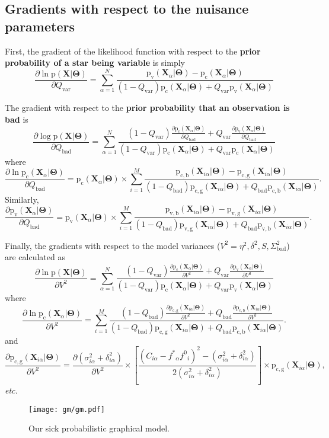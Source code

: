 \documentclass[12pt,preprint]{aastex}
\newcommand{\foreign}[1]{\emph{#1}}
\newcommand{\figlabel}[1]{\label{fig:#1}}
\newcommand{\paramvector}[1]{\boldsymbol{#1}}
\newcommand{\grad}[2]{\frac{\partial #1}{\partial #2}}
\renewcommand{\Pr}{\mathrm{p}}
\newcommand{\model}     {\ensuremath{\paramvector{\Theta}} }
\newcommand{\data}      {\ensuremath{\mathbf{X}} }
\newcommand{\X}         {\ensuremath{\mathbf{X}} }
\newcommand{\fstar}     {\ensuremath{f^*} }
\newcommand{\fzero}     {\ensuremath{f^0}}
\newcommand{\jabs}      {\ensuremath{\delta} }
\newcommand{\jrel}      {\ensuremath{\eta} }
\newcommand{\jitter}[1] {\ensuremath{\delta_{#1}^2} }
\newcommand{\Stot}      {\ensuremath{\sigma_{i\alpha}^2 + \jitter{i\alpha}} }
\newcommand{\Sbad}      {\ensuremath{\Sigma_\mathrm{bad}^2} }
\newcommand{\Qbad}      {\ensuremath{Q_\mathrm{bad}} }
\newcommand{\Qvar}      {\ensuremath{Q_\mathrm{var}} }
\newcommand{\Svar}      {\ensuremath{S} }
\newcommand{\pconst}    {\ensuremath{\Pr_\mathrm{c} (\X_\alpha | \model) }}
\newcommand{\pvar}      {\ensuremath{\Pr_\mathrm{v} (\X_\alpha | \model) }}
\newcommand{\pvarbad}   {\ensuremath{\Pr_\mathrm{v,b} (\X_{i\alpha} | \model)} }
\newcommand{\pvargood}  {\ensuremath{\Pr_\mathrm{v,g} (\X_{i\alpha} | \model)} }
\newcommand{\pconstbad} {\ensuremath{\Pr_\mathrm{c,b} (\X_{i\alpha} | \model)} }
\newcommand{\pconstgood}{\ensuremath{\Pr_\mathrm{c,g} (\X_{i\alpha} | \model)} }
\begin{document}
\subsection{Gradients with respect to the nuisance parameters}

First, the gradient of the likelihood function with respect to the {\bf prior
probability of a star being variable} is simply
\begin{equation}
    \grad{\ln \Pr (\data | \model)}{\Qvar} =
        \sum_{\alpha = 1}^{N} \frac{\pvar - \pconst}{ (1-\Qvar)
            \pconst  + \Qvar
            \pvar}
\end{equation}

The gradient with respect to the {\bf prior probability that an observation is
bad} is
\begin{equation}
    \grad{\log \Pr (\data | \model)}{\Qbad} =
        \sum_{\alpha = 1}^{N} \frac{(1-\Qvar)
            \grad{\pconst}{\Qbad}  + \Qvar
            \grad{\pvar}{\Qbad}}{ (1-\Qvar) \pconst  + \Qvar \pconst}
\end{equation}
where
\begin{equation}
    \grad{\ln \pconst}{\Qbad} = \pconst \times
        \sum_{i = 1}^{M} \frac{\pconstbad - \pconstgood}{ (1-\Qbad)
            \pconstgood  + \Qbad
            \pconstbad}.
\end{equation}
Similarly,
\begin{equation}
    \grad{\pvar}{\Qbad} = \pvar \times
        \sum_{i = 1}^{M} \frac{\pvarbad - \pvargood}{ (1-\Qbad)
            \pvargood  + \Qbad
            \pvarbad}.
\end{equation}

Finally, the gradients with respect to the model variances ($V^2 = \jrel^2, \jabs^2, \Svar, \Sbad$)
are calculated as
\begin{equation}
    \grad{\ln \Pr (\data | \model)}{V^2} = \sum_{\alpha=1}^{N}
        \frac{(1-\Qvar)\grad{\pconst}{V^2} + \Qvar \grad{\pvar}{V^2}}
            { (1-\Qvar)\pconst + \Qvar\pvar}
\end{equation}
where
\begin{equation}
    \grad{\ln \pconst}{V^2} =
        \sum_{i = 1}^{M}
            \frac{(1-\Qbad)\grad{\pconstgood}{V^2}
                + \Qbad \grad{\pconstbad}{V^2}}{ (1-\Qbad)
            \pconstgood  + \Qbad
            \pconstbad}.
\end{equation}
and
\begin{equation}
    \grad{\pconstgood}{V^2} = \grad{(\Stot)}{V^2} \times
        \left [ \frac{(C_{i\alpha} - \fstar_\alpha \fzero_i)^2-(\Stot)}{2(\Stot)} \right ]
        \times \pconstgood,
\end{equation}
\foreign{etc.}





\clearpage

\begin{figure}
    \begin{center}
        \texttt{[image: gm/gm.pdf]}
    \end{center}
    \caption{Our sick probabilistic graphical model.
    \figlabel{gm}}
\end{figure}
\end{document}
